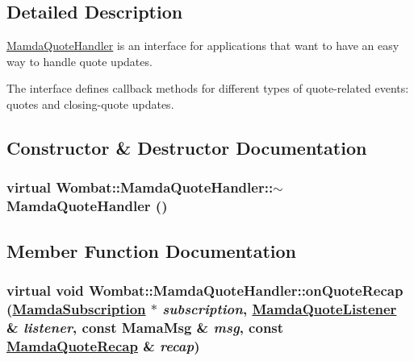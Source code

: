 \subsection{Detailed Description}
\hyperlink{classWombat_1_1MamdaQuoteHandler}{Mamda\-Quote\-Handler} is an interface for applications that want to have an easy way to handle quote updates. 

The interface defines callback methods for different types of quote-related events: quotes and closing-quote updates. 



\subsection{Constructor \& Destructor Documentation}
\hypertarget{classWombat_1_1MamdaQuoteHandler_552d394cad5214d6118e560f9007d0a1}{
\subsubsection[$\sim$MamdaQuoteHandler]{\setlength{\rightskip}{0pt plus 5cm}virtual Wombat::Mamda\-Quote\-Handler::$\sim$Mamda\-Quote\-Handler ()}}
\label{classWombat_1_1MamdaQuoteHandler_552d394cad5214d6118e560f9007d0a1}




\subsection{Member Function Documentation}
\hypertarget{classWombat_1_1MamdaQuoteHandler_c89e4a78d1e7d7d99a7dd39319d06b1e}{
\subsubsection[onQuoteRecap]{\setlength{\rightskip}{0pt plus 5cm}virtual void Wombat::Mamda\-Quote\-Handler::on\-Quote\-Recap (\hyperlink{classWombat_1_1MamdaSubscription}{Mamda\-Subscription} $\ast$ {\em subscription}, \hyperlink{classWombat_1_1MamdaQuoteListener}{Mamda\-Quote\-Listener} \& {\em listener}, const Mama\-Msg \& {\em msg}, const \hyperlink{classWombat_1_1MamdaQuoteRecap}{Mamda\-Quote\-Recap} \& {\em recap})}}
\label{classWombat_1_1MamdaQuoteHandler_c89e4a78d1e7d7d99a7dd39319d06b1e}


